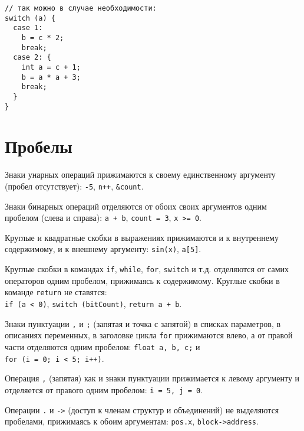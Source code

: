 \begin{verbatim}
// так можно в случае необходимости:
switch (a) {
  case 1:
    b = c * 2;
    break;
  case 2: {
    int a = c + 1;
    b = a * a + 3;
    break;
  }
}
\end{verbatim}


\section{Пробелы}


\zzstyleitem

Знаки унарных операций прижимаются к своему единственному аргументу
(пробел отсутствует): \texttt{-5}, \texttt{n++}, \texttt{\&count}.

\zzstyleitem

Знаки бинарных операций отделяются от обоих своих аргументов одним
пробелом (слева и справа): \texttt{a\ +\ b}, \texttt{count\ =\ 3},
\texttt{x~\textgreater{}=~0}.

\zzstyleitem

Круглые и квадратные скобки в выражениях прижимаются и к внутреннему
содержимому, и к внешнему аргументу: \texttt{sin(x)}, \texttt{a{[}5{]}}.

\zzstyleitem

Круглые скобки в командах \texttt{if}, \texttt{while}, \texttt{for},
\texttt{switch} и т.д. отделяются от самих операторов одним пробелом,
прижимаясь к содержимому. Круглые скобки в команде \texttt{return} не
ставятся:\\\texttt{if\ (a\ \textless{}\ 0)}, \texttt{switch\ (bitCount)},
\texttt{return\ a\ +\ b}.

\zzstyleitem

Знаки пунктуации \texttt{,} и \texttt{;} (запятая и точка с запятой) в
списках параметров, в описаниях переменных, в заголовке цикла
\texttt{for} прижимаются влево, а от правой части отделяются одним
пробелом: \texttt{float\ a,\ b,\ c;} и
\texttt{for\ (i\ =\ 0;\ i\ \textless{}\ 5;\ i++)}.

\zzstyleitem

Операция \texttt{,} (запятая) как и знаки пунктуации прижимается к левому
аргументу и отделяется от правого одним пробелом:
\texttt{i\ =\ 5,\ j\ =\ 0}.

\zzstyleitem

Операции \texttt{.} и \texttt{-\textgreater{}} (доступ к членам структур
и объединений) не выделяются пробелами, прижимаясь к обоим аргументам:
\texttt{pos.x}, \texttt{block-\textgreater{}address}.

